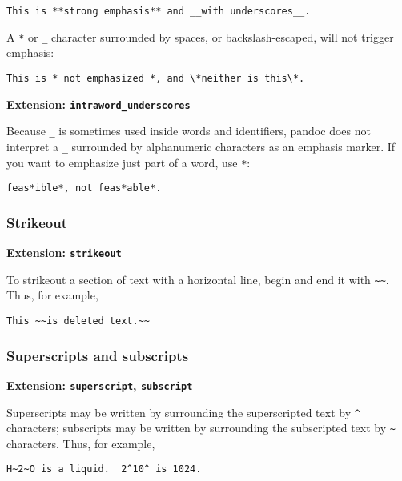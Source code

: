 \documentclass[]{article}
\begin{document}
\begin{verbatim}
This is **strong emphasis** and __with underscores__.
\end{verbatim}

A \texttt{*} or \texttt{\_} character surrounded by spaces, or
backslash-escaped, will not trigger emphasis:

\begin{verbatim}
This is * not emphasized *, and \*neither is this\*.
\end{verbatim}

\textbf{Extension: \texttt{intraword\_underscores}}

Because \texttt{\_} is sometimes used inside words and identifiers,
pandoc does not interpret a \texttt{\_} surrounded by alphanumeric
characters as an emphasis marker. If you want to emphasize just part of
a word, use \texttt{*}:

\begin{verbatim}
feas*ible*, not feas*able*.
\end{verbatim}

\subsubsection{Strikeout}\label{strikeout}

\textbf{Extension: \texttt{strikeout}}

To strikeout a section of text with a horizontal line, begin and end it
with \texttt{\textasciitilde{}\textasciitilde{}}. Thus, for example,

\begin{verbatim}
This ~~is deleted text.~~
\end{verbatim}

\subsubsection{Superscripts and
subscripts}\label{superscripts-and-subscripts}

\textbf{Extension: \texttt{superscript}, \texttt{subscript}}

Superscripts may be written by surrounding the superscripted text by
\texttt{\^{}} characters; subscripts may be written by surrounding the
subscripted text by \texttt{\textasciitilde{}} characters. Thus, for
example,

\begin{verbatim}
H~2~O is a liquid.  2^10^ is 1024.
\end{verbatim}
\end{document}
